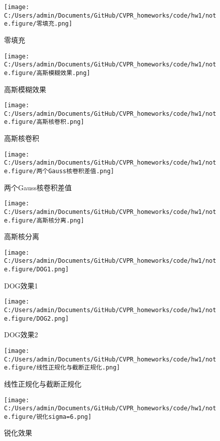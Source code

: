 \documentclass[12pt, a4paper, oneside]{ctexart}
\begin{document}
\begin{figure}[htbp]
    \centering
    \texttt{[image: C:/Users/admin/Documents/GitHub/CVPR\_homeworks/code/hw1/note.figure/零填充.png]}
    \caption{零填充\label{零填充}}
\end{figure}
\begin{figure}[htbp]
    \centering
    \texttt{[image: C:/Users/admin/Documents/GitHub/CVPR\_homeworks/code/hw1/note.figure/高斯模糊效果.png]}
    \caption{高斯模糊效果\label{高斯模糊效果}}
\end{figure}
\begin{figure}[htbp]
    \centering
    \texttt{[image: C:/Users/admin/Documents/GitHub/CVPR\_homeworks/code/hw1/note.figure/高斯核卷积.png]}
    \caption{高斯核卷积\label{高斯核卷积}}
\end{figure}
\begin{figure}[htbp]
    \centering
    \texttt{[image: C:/Users/admin/Documents/GitHub/CVPR\_homeworks/code/hw1/note.figure/两个Gauss核卷积差值.png]}
    \caption{两个Gauss核卷积差值\label{两个Gauss核卷积差值}}
\end{figure}
\begin{figure}[htbp]
    \centering
    \texttt{[image: C:/Users/admin/Documents/GitHub/CVPR\_homeworks/code/hw1/note.figure/高斯核分离.png]}
    \caption{高斯核分离\label{高斯核分离}}
\end{figure}
\begin{figure}[htbp]
    \centering
    \texttt{[image: C:/Users/admin/Documents/GitHub/CVPR\_homeworks/code/hw1/note.figure/DOG1.png]}
    \caption{DOG效果1\label{DOG效果图1}}
\end{figure}
\begin{figure}[htbp]
    \centering
    \texttt{[image: C:/Users/admin/Documents/GitHub/CVPR\_homeworks/code/hw1/note.figure/DOG2.png]}
    \caption{DOG效果2\label{DOG效果图2}}
\end{figure}
\begin{figure}[htbp]
    \centering
    \texttt{[image: C:/Users/admin/Documents/GitHub/CVPR\_homeworks/code/hw1/note.figure/线性正规化与截断正规化.png]}
    \caption{线性正规化与截断正规化\label{线性正规化与截断正规化}}
\end{figure}
\begin{figure}[htbp]
    \centering
    \texttt{[image: C:/Users/admin/Documents/GitHub/CVPR\_homeworks/code/hw1/note.figure/锐化sigma=6.png]}
    \caption{锐化效果\label{锐化效果}}
\end{figure}
\end{document}
